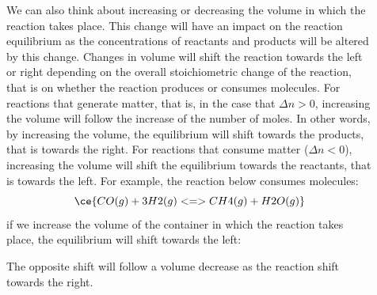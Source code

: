 \documentclass[main.tex]{subfiles}
\begin{document}
\begin{description}
 \item[] 
 We can also think about increasing or decreasing the volume in which the reaction takes place. This change will have an impact on the reaction equilibrium as the concentrations of reactants and products will be altered by this change. Changes in volume will shift the reaction towards the left or right depending on the overall stoichiometric change of the reaction, that is on whether the reaction produces or consumes molecules. For reactions that generate matter, that is, in the case that $\Delta n >0$, increasing the volume will follow the increase of the number of moles. In other words, by increasing the volume, the equilibrium will shift towards the products, that is towards the right. For reactions that consume matter ($\Delta n <0$), increasing the volume will shift the equilibrium towards the reactants, that is towards the left.
For example, the reaction below consumes molecules:
 \begin{equation*} \ce{CO(g) + 3H2(g) <=> CH4(g) + H2O(g) } \end{equation*}
if we increase the volume of the container in which the reaction takes place, the equilibrium will shift towards the left:
\begin{center}
\end{center}
The opposite shift will follow a volume decrease as the reaction shift towards the right.


\end{description}
\end{document}
